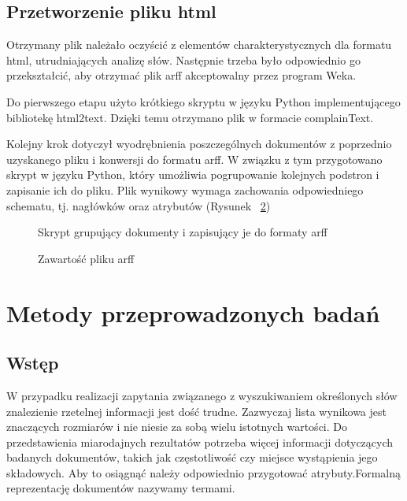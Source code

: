 \documentclass{classrep}
\begin{document}
    \subsection{Przetworzenie pliku html}

    Otrzymany plik należało oczyścić z elementów charakterystycznych dla formatu html, utrudniających analizę słów. Następnie trzeba było odpowiednio go przekształcić, aby otrzymać plik arff akceptowalny przez program Weka.
    
    Do pierwszego etapu użyto krótkiego skryptu w języku Python implementującego bibliotekę html2text. Dzięki temu otrzymano plik w formacie complainText.
    
    Kolejny krok dotyczył wyodrębnienia poszczególnych dokumentów z poprzednio uzyskanego pliku i konwersji do formatu arff. W związku z tym przygotowano skrypt w języku Python, który umożliwia pogrupowanie kolejnych podstron i zapisanie ich do pliku. Plik wynikowy wymaga zachowania odpowiedniego schematu, tj. nagłówków oraz atrybutów (Rysunek ~\ref{arff_format})
 

    \begin{figure}[H] 
    	\begin{center}
        \caption{Skrypt grupujący dokumenty i zapisujący je do formaty arff}
        \label{plain_python}
    	\end{center}
    \end{figure}


    \begin{figure}[H] 
    	\begin{center}
        \caption{Zawartość pliku arff}
        \label{arff_format}
    	\end{center}
    \end{figure}


\section{Metody przeprowadzonych badań}    
    
    \subsection{Wstęp}
    
    W przypadku realizacji zapytania związanego z wyszukiwaniem określonych słów znalezienie rzetelnej informacji jest dość trudne. Zazwyczaj lista wynikowa jest znaczących rozmiarów i nie niesie za sobą wielu istotnych wartości. Do przedstawienia miarodajnych rezultatów potrzeba więcej informacji dotyczących badanych dokumentów, takich jak częstotliwość czy miejsce wystąpienia jego składowych. Aby to osiągnąć należy odpowiednio przygotować atrybuty.Formalną reprezentację dokumentów nazywamy termami.
\end{document}
